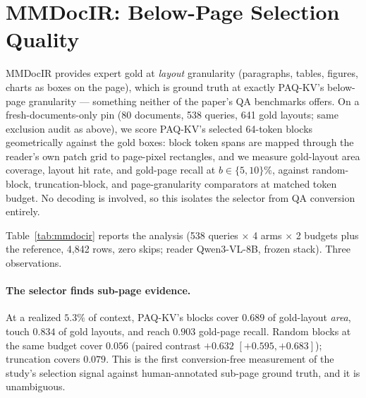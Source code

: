 \documentclass[letterpaper]{article} %
\newcommand{\paqc}{\textsc{PAQ-KV}}
\begin{document}
\section{MMDocIR: Below-Page Selection Quality}\label{sec:mmdocir}

MMDocIR provides expert gold at \emph{layout} granularity (paragraphs, tables, figures, charts as boxes on the page), which is ground truth at exactly \paqc{}'s below-page granularity --- something neither of the paper's QA benchmarks offers. On a fresh-documents-only pin (80 documents, 538 queries, 641 gold layouts; same exclusion audit as above), we score \paqc{}'s selected 64-token blocks geometrically against the gold boxes: block token spans are mapped through the reader's own patch grid to page-pixel rectangles, and we measure gold-layout area coverage, layout hit rate, and gold-page recall at $b\in\{5,10\}\%$, against random-block, truncation-block, and page-granularity comparators at matched token budget. No decoding is involved, so this isolates the selector from QA conversion entirely.

\begin{table}[t]
\centering\small
\setlength{\tabcolsep}{4pt}

\caption{Selection quality against MMDocIR's sub-page gold layouts on the 80-document fresh pin (538 queries). ``Coverage'' is the fraction of gold-layout area covered by selected blocks on gold pages; ``hit'' the fraction of gold layouts touched at all; ``gold-page recall'' the fraction of gold pages receiving any block. Development-grade.}
\label{tab:mmdocir}
\end{table}

Table~\ref{tab:mmdocir} reports the analysis (538 queries $\times$ 4 arms $\times$ 2 budgets plus the reference, 4{,}842 rows, zero skips; reader Qwen3-VL-8B, frozen stack). Three observations.

\paragraph{The selector finds sub-page evidence.} At a realized $5.3\%$ of context, \paqc{}'s blocks cover $0.689$ of gold-layout \emph{area}, touch $0.834$ of gold layouts, and reach $0.903$ gold-page recall. Random blocks at the same budget cover $0.056$ (paired contrast $+0.632$ $[+0.595,+0.683]$); truncation covers $0.079$. This is the first conversion-free measurement of the study's selection signal against human-annotated sub-page ground truth, and it is unambiguous.
\end{document}
